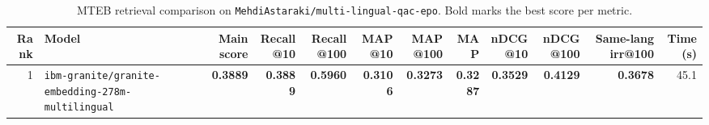 \begin{table}[t]
\centering
\small
\begin{tabular}{r l r r r r r r r r r r}
\hline
Rank & Model & Main score & Recall@10 & Recall@100 & MAP@10 & MAP@100 & MAP & nDCG@10 & nDCG@100 & Same-lang irr@100 & Time (s) \\
\hline
1 & \texttt{ibm-granite/granite-embedding-278m-multilingual} & \textbf{0.3889} & \textbf{0.3889} & \textbf{0.5960} & \textbf{0.3106} & \textbf{0.3273} & \textbf{0.3287} & \textbf{0.3529} & \textbf{0.4129} & \textbf{0.3678} & 45.1 \\
\hline
\end{tabular}
\caption{MTEB retrieval comparison on \texttt{MehdiAstaraki/multi-lingual-qac-epo}. Bold marks the best score per metric.}
\label{tab:mteb-model-comparison}
\end{table}
